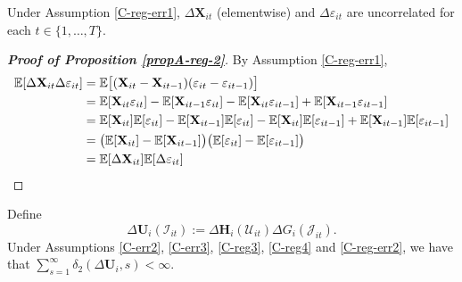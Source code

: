 \documentclass[a4paper,12pt]{article}
\begin{document}
 \begin{propA}\label{propA-reg-2}
Under Assumption \ref{C-reg-err1}, $\Delta \mathbf{X}_{it}$ (elementwise) and $\Delta \varepsilon_{it}$ are uncorrelated for each $t\in \{1, \ldots, T\}$.
\end{propA}

\begin{proof}[\textnormal{\textbf{Proof of Proposition \ref{propA-reg-2}}}]
By Assumption \ref{C-reg-err1},
\begin{align*}
\mathbb{E} [\Delta \mathbf{X}_{it}\Delta \varepsilon_{it}] &= \mathbb{E} \big[(\mathbf{X}_{it} - \mathbf{X}_{it-1}) (\varepsilon_{it} - \varepsilon_{it-1})\big] \\
&=\mathbb{E}[\mathbf{X}_{it}  \varepsilon_{it}] - \mathbb{E}[\mathbf{X}_{it-1}  \varepsilon_{it}]- \mathbb{E}[\mathbf{X}_{it}  \varepsilon_{it-1}] + \mathbb{E}[\mathbf{X}_{it-1}  \varepsilon_{it-1}] \\
&= \mathbb{E}[\mathbf{X}_{it}]\mathbb{E}[  \varepsilon_{it}] - \mathbb{E}[\mathbf{X}_{it-1}]\mathbb{E}[  \varepsilon_{it}]- \mathbb{E}[\mathbf{X}_{it}]\mathbb{E}[  \varepsilon_{it-1}] + \mathbb{E}[\mathbf{X}_{it-1}]\mathbb{E}[  \varepsilon_{it-1}] \\
&= \big( \mathbb{E}[\mathbf{X}_{it}] - \mathbb{E}[\mathbf{X}_{it-1}]\big)\big(\mathbb{E}[  \varepsilon_{it}]  - \mathbb{E}[\varepsilon_{it-1}]\big) \\
&= \mathbb{E} [\Delta \mathbf{X}_{it}]\mathbb{E}[\Delta \varepsilon_{it}]
\end{align*}
\end{proof} 


\begin{propA}\label{propA-reg-3}
Define 
\[ \Delta \mathbf{U}_i(\mathcal{I}_{it}) := \Delta \mathbf{H}_i(\mathcal{U}_{it}) \Delta G_i(\mathcal{J}_{it}).
\]
Under Assumptions \ref{C-err2}, \ref{C-err3}, \ref{C-reg3}, \ref{C-reg4} and \ref{C-reg-err2}, we have that \linebreak $\sum_{s=1}^\infty \delta_2(\Delta \mathbf{U}_i, s) < \infty$.
\end{propA}
\end{document}
